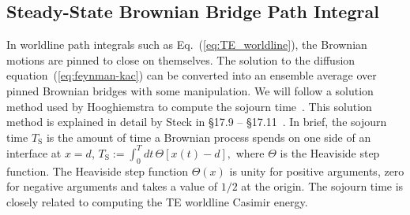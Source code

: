 \subsection{Steady-State Brownian Bridge Path Integral}

In worldline path integrals such as Eq.~(\ref{eq:TE_worldline}), 
the Brownian motions are pinned to close on themselves.
The solution to the diffusion equation~(\ref{eq:feynman-kac}) can be converted into an 
ensemble average over pinned Brownian bridges  with some manipulation.
We will follow a solution method used by Hooghiemstra to compute the sojourn time~\cite{
Hooghiemstra2002}.  
This solution method is explained in detail by Steck in \S 17.9 -- \S 17.11~\cite{SteckNotes}.
In brief, the sojourn time $T_\text{S}$
is the amount of time a Brownian process spends on one side of an interface at $x=d$,
$T_\text{S}:= \int_0^T dt\,\Theta[x(t)-d],$ where $\Theta$ is the Heaviside step function.
The Heaviside step function $\Theta(x)$ is unity for positive arguments, zero for negative arguments 
and takes a value of $1/2$ at the origin.
The sojourn time is closely related to computing the TE worldline Casimir energy.

